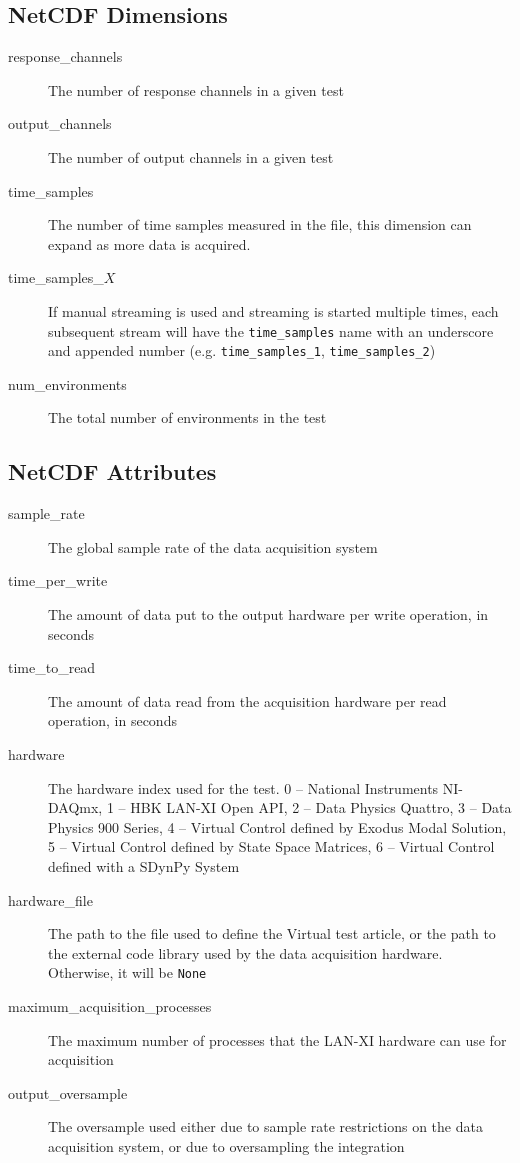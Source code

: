 \documentclass[pdf,12pt,report]{SANDreport}
\newcommand{\inlineCode}{\lstinline[basicstyle=\bfseries\ttfamily]}
\begin{document}
    \subsection{NetCDF Dimensions}
    \begin{description}
        \item[{response\_channels}] The number of response channels in a given test
        \item[{output\_channels}] The number of output channels in a given test
        \item[{time\_samples}] The number of time samples measured in the file, this dimension can expand as more data is acquired.
        \item[{time\_samples\_$X$}] If manual streaming is used and streaming is started multiple times, each subsequent stream will have the \inlineCode{time_samples} name with an underscore and appended number (e.g. \inlineCode{time_samples_1}, \inlineCode{time_samples_2})
        \item[{num\_environments}] The total number of environments in the test
    \end{description}
    \subsection{NetCDF Attributes}
    \begin{description}
        \item[sample\_rate] The global sample rate of the data acquisition system
        \item[time\_per\_write] The amount of data put to the output hardware per write operation, in seconds
        \item[time\_to\_read] The amount of data read from the acquisition hardware per read operation, in seconds
        \item[hardware] The hardware index used for the test.  0 -- National Instruments NI-DAQmx, 1 -- HBK LAN-XI Open API, 2 -- Data Physics Quattro, 3 -- Data Physics 900 Series, 4 -- Virtual Control defined by Exodus Modal Solution, 5 -- Virtual Control defined by State Space Matrices, 6 -- Virtual Control defined with a SDynPy System
        \item[hardware\_file] The path to the file used to define the Virtual test article, or the path to the external code library used by the data acquisition hardware.  Otherwise, it will be \inlineCode{None}
        \item[maximum\_acquisition\_processes] The maximum number of processes that the LAN-XI hardware can use for acquisition
        \item[output\_oversample] The oversample used either due to sample rate restrictions on the data acquisition system, or due to oversampling the integration
    \end{description}
\end{document}
